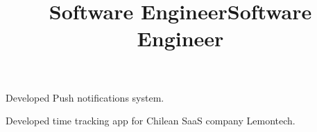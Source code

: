 \begin{resume}
\title{Software Engineer}
\begin{position}
Developed Push notifications system.
\end{position}

\title{Software Engineer}
\begin{position}
Developed time tracking app for Chilean SaaS company Lemontech.
\end{position}











\end{resume}
